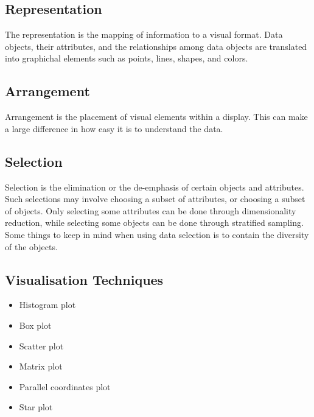 \subsection{Representation}
The representation is the mapping of information to a visual format. Data objects, their attributes, and the relationships among data objects are translated into graphichal elements such as points, lines, shapes, and colors.

\subsection{Arrangement}
Arrangement is the placement of visual elements within a display. This can make a large difference in how easy it is to understand the data.

\subsection{Selection}
Selection is the elimination or the de-emphasis of certain objects and attributes.
Such selections may involve choosing a subset of attributes, or choosing a subset of objects. Only selecting some attributes can be done through dimensionality reduction, while selecting some objects can be done through stratified sampling.
Some things to keep in mind when using data selection is to contain the diversity of the objects.

\subsection{Visualisation Techniques}
\begin{itemize}
    \item Histogram plot
    \item Box plot
    \item Scatter plot
    \item Matrix plot
    \item Parallel coordinates plot
    \item Star plot
\end{itemize}
